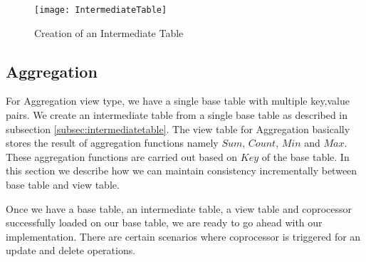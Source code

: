 \documentclass[11pt,a4paper,bibtotoc,idxtotoc,headsepline,footsepline,footexclude,BCOR12mm,DIV13]{scrbook}
\begin{document}
\begin{figure}
    \centering
    \texttt{[image: IntermediateTable]}
    \caption{Creation of an Intermediate Table}
    \label{Intermediate Table}
    
\end{figure}

\newpage
\subsection{Aggregation}
\label{sec:aggregationImpl}

For Aggregation view type, we have a single base table with multiple key,value pairs. We create an intermediate table from a single base table as described in subsection \ref{subsec:intermediatetable}. The view table for Aggregation basically stores the result of aggregation functions namely $Sum$, $Count$, $Min$ and $Max$. These aggregation functions are carried out based on $Key$ of the base table. In this section we describe how we can maintain consistency incrementally between base table and view table. 



    

Once we have a base table, an intermediate table, a view table and coprocessor successfully loaded on our base table, we are ready to go ahead with our implementation. There are certain scenarios where coprocessor is triggered for an update and delete operations.
\end{document}
